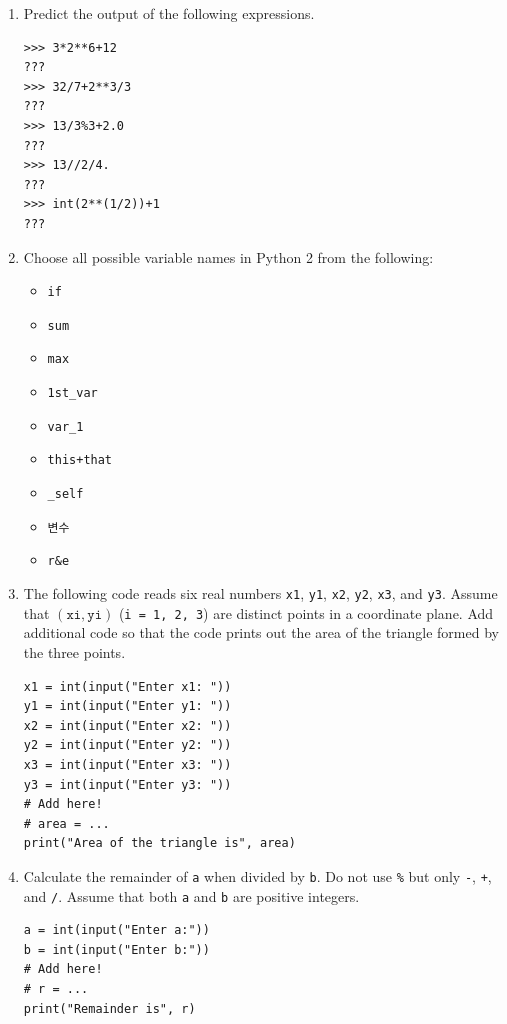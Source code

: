 \documentclass[../main.tex]{subfiles}
\begin{document}
\begin{enumerate}
\item Predict the output of the following expressions.
\begin{verbatim}
>>> 3*2**6+12
???
>>> 32/7+2**3/3
???
>>> 13/3%3+2.0
???
>>> 13//2/4.
???
>>> int(2**(1/2))+1
???
\end{verbatim}

\item Choose all possible variable names in Python 2 from the following:
\begin{itemize}
\item \texttt{if}
\item \texttt{sum}
\item \texttt{max}
\item \texttt{1st\_var}
\item \texttt{var\_1}
\item \texttt{this+that}
\item \texttt{\_self}
\item \texttt{변수}
\item \texttt{r\&e}
\end{itemize}

\item The following code reads six real numbers \texttt{x1}, \texttt{y1}, \texttt{x2}, \texttt{y2}, \texttt{x3}, and \texttt{y3}.
Assume that $(\texttt{xi}, \texttt{yi})$ (\texttt{i = 1, 2, 3}) are distinct points in a coordinate plane.
Add additional code so that the code prints out the area of the triangle formed by the three points.
\begin{verbatim}
x1 = int(input("Enter x1: "))
y1 = int(input("Enter y1: "))
x2 = int(input("Enter x2: "))
y2 = int(input("Enter y2: "))
x3 = int(input("Enter x3: "))
y3 = int(input("Enter y3: "))
# Add here!
# area = ...
print("Area of the triangle is", area)
\end{verbatim}

\item Calculate the remainder of \texttt{a} when divided by \texttt{b}.
Do not use \texttt{\%} but only \texttt{-}, \texttt{+}, and \texttt{/}.
Assume that both \texttt{a} and \texttt{b} are positive integers.
\begin{verbatim}
a = int(input("Enter a:"))
b = int(input("Enter b:"))
# Add here!
# r = ...
print("Remainder is", r)
\end{verbatim}


\end{enumerate}
\end{document}
